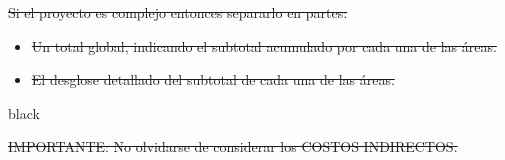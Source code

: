 \documentclass[11pt]{charter}
\providecommand{\DIFdel}[1]{{\protect\color{red}\sout{#1}}}                      %
\providecommand{\DIFaddbegin}{} %
\providecommand{\DIFaddend}{} %
\providecommand{\DIFdelbegin}{} %
\providecommand{\DIFdelend}{} %
\begin{document}
\DIFdelbegin %
\DIFdel{Si el proyecto es complejo entonces separarlo en partes:
}%
\begin{itemize}%
\item%
\DIFdel{Un total global, indicando el subtotal acumulado por cada una de las áreas.
}%
\item%
\DIFdel{El desglose detallado del subtotal de cada una de las áreas.
}
\end{itemize}%
\DIFdelend \DIFaddbegin \begin{consigna}{black}
\DIFaddend 

\DIFdelbegin \DIFdel{IMPORTANTE: No olvidarse de considerar los COSTOS INDIRECTOS.
}%



\end{consigna}
\end{document}
